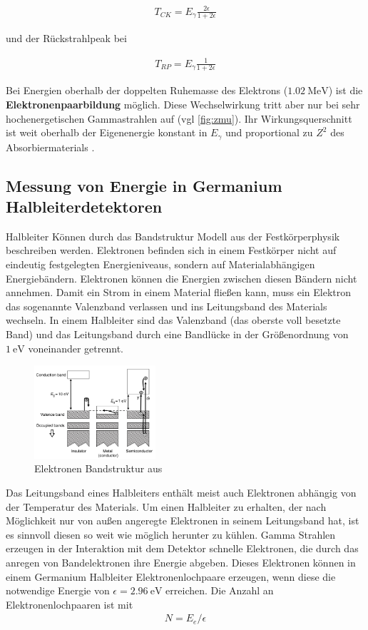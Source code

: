 \begin{align}
	T_{CK}= E_\gamma \frac{2\epsilon}{1+2\epsilon}
	\label{eq:CK}
\end{align}

und der Rückstrahlpeak bei

\begin{align}
	T_{RP}= E_\gamma \frac{1}{1+2\epsilon}
	\label{eq:RP}
\end{align}

Bei Energien oberhalb der doppelten Ruhemasse des Elektrons ($\qty{1.02}{\MeV}$)
ist die \textbf{Elektronenpaarbildung} möglich. Diese Wechselwirkung tritt aber
nur bei sehr hochenergetischen Gammastrahlen auf (vgl \ref{fig:zmu}). Ihr
Wirkungsquerschnitt ist weit oberhalb der Eigenenergie konstant in $E_\gamma$
und proportional zu $Z^2$ des Absorbiermaterials \cite[vgl.][Kap
	3.5.5]{book:kolano}.

\subsection{Messung von Energie in Germanium Halbleiterdetektoren \cite{book:gil}}

Halbleiter Können durch das Bandstruktur Modell aus der Festkörperphysik
beschreiben werden. Elektronen befinden sich in einem Festkörper nicht auf
eindeutig festgelegten Energieniveaus, sondern auf Materialabhängigen
Energiebändern. Elektronen können die Energien zwischen diesen Bändern nicht
annehmen. Damit ein Strom in einem Material fließen kann, muss ein Elektron das
sogenannte Valenzband verlassen und ins Leitungsband des Materials wechseln. In
einem Halbleiter sind das Valenzband (das oberste voll besetzte Band) und das
Leitungsband durch eine Bandlücke in der Größenordnung von $\qty{1}{\eV}$
voneinander getrennt.
\begin{figure}
	\centering
	\includegraphics[width=0.4\textwidth]{./Bilder/ElectronBandsGilmore.png}
	\caption{Elektronen Bandstruktur aus \cite{book:gil}}\label{fig:eband}
\end{figure}
Das Leitungsband eines Halbleiters enthält meist auch Elektronen abhängig von
der Temperatur des Materials.
Um einen Halbleiter zu erhalten, der nach Möglichkeit nur von außen angeregte
Elektronen in seinem Leitungsband hat, ist es sinnvoll diesen so weit wie
möglich herunter zu kühlen. Gamma Strahlen erzeugen in der Interaktion mit dem
Detektor schnelle Elektronen, die durch das anregen von Bandelektronen ihre
Energie abgeben. Dieses Elektronen können in einem Germanium Halbleiter
Elektronenlochpaare erzeugen, wenn diese die notwendige Energie von $\epsilon =
	\qty{2.96}{\eV}$ erreichen. Die Anzahl an Elektronenlochpaaren ist mit
\begin{align}
	N = E_e / \epsilon
\end{align}

